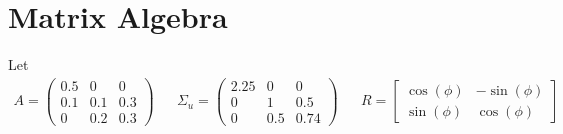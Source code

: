 \section[Matrix Algebra]{Matrix Algebra\label{ex:MatrixAlgebra}}
Let
\begin{align*}
A = \begin{pmatrix}0.5 &0 &0 \\0.1&0.1&0.3\\0&0.2&0.3 \end{pmatrix}
&&
\Sigma_u = \begin{pmatrix}2.25 & 0 & 0\\ 0 & 1 & 0.5\\ 0 & 0.5 & 0.74 \end{pmatrix}
&&
R = \begin{bmatrix} \cos(\phi) & -\sin(\phi)\\ \sin(\phi) & \cos(\phi) \end{bmatrix}
\end{align*}
